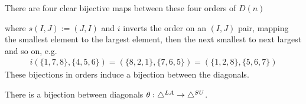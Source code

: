 There are four clear bijective maps between these four orders of $D(n)$
\begin{center}
\end{center}
where $s(I,J):=(J,I)$ and $i$ inverts the order on an $(I,J)$ pair, mapping the smallest element to the largest element, then the next smallest to next largest and so on, e.g. 
\begin{align*}
    i(\{1, 7, 8\} , \{ 4, 5, 6 \}) = (\{8,2,1\},\{7,6,5\}) = (\{1,2,8\},\{5,6,7\})
\end{align*}
These bijections in orders induce a bijection between the diagonals. 
\begin{proposition}\label{p:IJ level bijection}
There is a bijection between diagonals $\theta:\triangle^{LA} \to \triangle^{SU}$.
\end{proposition}
